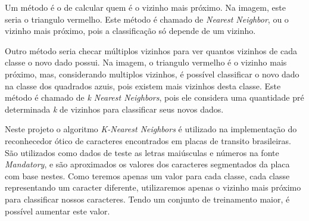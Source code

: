 Um método é o de calcular quem é o vizinho mais próximo. Na imagem, este seria o triangulo vermelho. Este método é chamado de \emph{Nearest Neighbor}, ou o vizinho mais próximo, pois a classificação só depende de um vizinho.

Outro método seria checar múltiplos vizinhos para ver quantos vizinhos de cada classe o novo dado possui. Na imagem, o triangulo vermelho é o vizinho mais próximo, mas, considerando multiplos vizinhos, é possível classificar o novo dado na classe dos quadrados azuis, pois existem mais vizinhos desta classe. Este método é chamado de \emph{k Nearest Neighbors}, pois ele considera uma quantidade pré determinada \emph{k} de vizinhos para classificar seus novos dados. ~\cite{opencv2014knearest}

Neste projeto o algoritmo \emph{K-Nearest Neighbors} é utilizado na implementação do reconhecedor ótico de caracteres encontrados em placas de transito brasileiras. São utilizados como dados de teste as letras maiúsculas e números na fonte \emph{Mandatory}, e são aproximados os valores dos caracteres segmentados da placa com base nestes. Como teremos apenas um valor para cada classe, cada classe representando um caracter diferente, utilizaremos apenas o vizinho mais próximo para classificar nossos caracteres. Tendo um conjunto de treinamento maior, é possível aumentar este valor.
 
